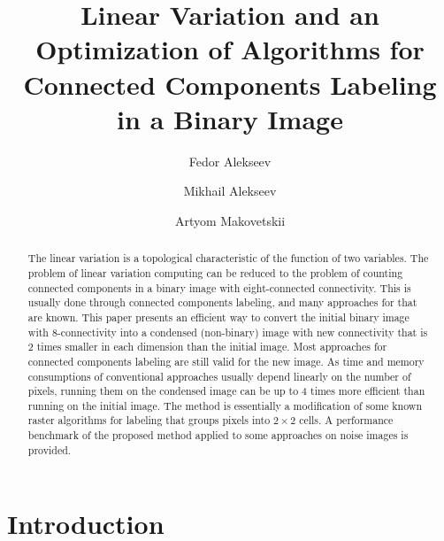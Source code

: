 \documentclass[hidelinks]{llncs}
\begin{document}
\title{Linear Variation and an Optimization of Algorithms for Connected
Components Labeling in a Binary Image}

\author{Fedor Alekseev \and Mikhail Alekseev
\and Artyom Makovetskii}


\maketitle              %

\begin{abstract}
The linear variation is a topological characteristic of the function of two
variables. The problem of linear variation computing can be reduced to the
problem of counting connected components in a binary image with eight-connected
connectivity.
This is usually done through connected components labeling, and many approaches
for that are known. This paper presents an efficient way to convert the initial
binary image with 8-connectivity into a condensed (non-binary) image with new
connectivity that is 2 times smaller in each dimension than the initial image.
Most approaches for connected components labeling are still valid for the new
image. As time and memory consumptions of conventional approaches usually
depend linearly on the number of pixels, running them on the condensed image
can be up to 4 times more efficient than running on the initial image. The
method is essentially a modification of some known raster algorithms for
labeling that groups pixels into $2 \times 2$ cells. A performance benchmark of
the proposed  method applied to some approaches on noise images is provided.

\end{abstract}

\section{Introduction}
\end{document}
